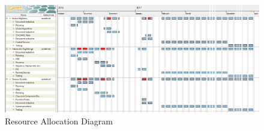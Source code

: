\begin{figure}[h]
	\centering
	\includegraphics[width=\textwidth]{Images/RESOURCE}
	\caption{Resource Allocation Diagram}
\end{figure}